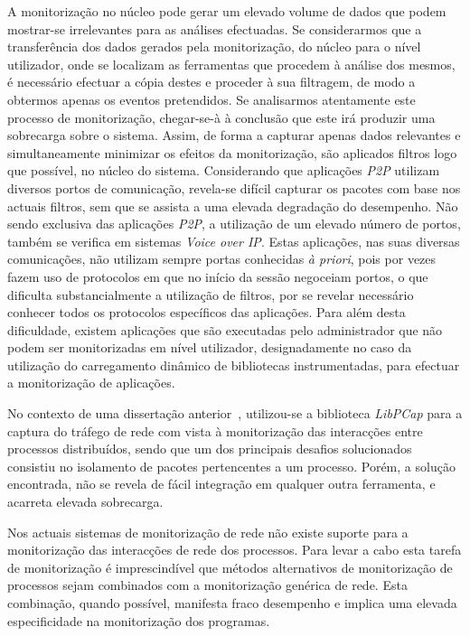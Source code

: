 A monitorização no núcleo pode gerar um elevado volume de dados que podem mostrar-se irrelevantes para as análises efectuadas.
Se considerarmos que a transferência dos dados gerados pela monitorização, do núcleo para o nível utilizador, onde se localizam as ferramentas que procedem à análise dos mesmos, é necessário efectuar a cópia destes e proceder à sua filtragem, de modo a obtermos apenas os eventos pretendidos.
Se analisarmos atentamente este processo de monitorização, chegar-se-à à conclusão que este irá produzir uma sobrecarga sobre o sistema.
Assim, de forma a capturar apenas dados relevantes e simultaneamente minimizar os efeitos da monitorização, são aplicados filtros logo que possível, no núcleo do sistema.
Considerando que aplicações \textit{P2P} utilizam diversos portos de comunicação, revela-se difícil capturar os pacotes com base nos actuais filtros, sem que se assista a uma elevada degradação do desempenho.
Não sendo exclusiva das aplicações \textit{P2P}, a utilização de um elevado número de portos, também se verifica em sistemas \textit{Voice over IP}.
Estas aplicações, nas suas diversas comunicações, não utilizam sempre portas conhecidas \textit{à priori}, pois por vezes fazem uso de protocolos em que no início da sessão negoceiam portos, o que dificulta substancialmente a utilização de filtros, por se revelar necessário conhecer todos os protocolos específicos das aplicações.
Para além desta dificuldade, existem aplicações que são executadas pelo administrador que não podem ser monitorizadas em nível utilizador, designadamente no caso da utilização do carregamento dinâmico de bibliotecas instrumentadas, para efectuar a monitorização de aplicações.

No contexto de uma dissertação anterior~\cite{Farruca:2009}, utilizou-se a biblioteca \textit{LibPCap} para a captura do tráfego de rede com vista à monitorização das interacções entre processos distribuídos, sendo que um dos principais desafios solucionados consistiu no isolamento de pacotes pertencentes a um processo.
Porém, a solução encontrada, não se revela de fácil integração em qualquer outra ferramenta, e acarreta elevada sobrecarga.

Nos actuais sistemas de monitorização de rede não existe suporte para a monitorização das interacções de rede dos processos.
Para levar a cabo esta tarefa de monitorização é imprescindível que métodos alternativos de monitorização de processos sejam combinados com a monitorização genérica de rede.
Esta combinação, quando possível, manifesta fraco desempenho e implica uma elevada especificidade na monitorização dos programas.


